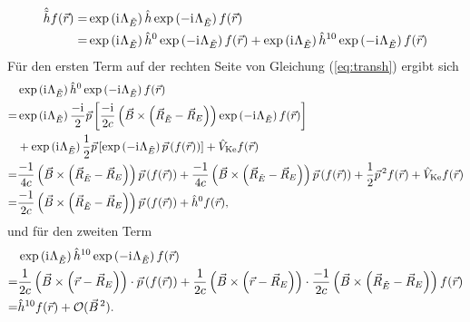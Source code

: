 	\begin{equation}\label{eq:transh}
	\begin{aligned}
	\hat{\tilde{h}}f(\vec{r})=&\exp\left(\mathrm{i}\mkern1mu\Lambda_{\tilde{E}}\right)\hat{h}\exp\left(-\mathrm{i}\mkern1mu\Lambda_{\tilde{E}}\right)f(\vec{r})\\
	=&\exp\left(\mathrm{i}\mkern1mu\Lambda_{\tilde{E}}\right)\hat{h}^0\exp\left(-\mathrm{i}\mkern1mu\Lambda_{\tilde{E}}\right)f(\vec{r})+\exp\left(\mathrm{i}\mkern1mu\Lambda_{\tilde{E}}\right)\hat{h}^{10}\exp\left(-\mathrm{i}\mkern1mu\Lambda_{\tilde{E}}\right)f(\vec{r})
	\end{aligned}
	\end{equation}
	Für den ersten Term auf der rechten Seite von Gleichung (\ref{eq:transh}) ergibt sich
	\begin{equation}\label{eq:transh1}
	\begin{aligned}
	&\exp\left(\mathrm{i}\mkern1mu\Lambda_{\tilde{E}}\right)\hat{h}^0\exp\left(-\mathrm{i}\mkern1mu\Lambda_{\tilde{E}}\right)f(\vec{r})\\
	=&\exp\left(\mathrm{i}\mkern1mu\Lambda_{\tilde{E}}\right)\frac{-\mathrm{i}\mkern1mu}{2}\vec{p}\left[\frac{-\mathrm{i}\mkern1mu}{2c}\left(\vec{B}\times\left(\vec{R}_{\tilde{E}}-\vec{R}_E\right)\right)\exp\left(-\mathrm{i}\mkern1mu\Lambda_{\tilde{E}}\right)f(\vec{r})\right]\\
	&+\exp\left(\mathrm{i}\mkern1mu\Lambda_{\tilde{E}}\right)\frac{1}{2}\vec{p}\left[\exp\left(-\mathrm{i}\mkern1mu\Lambda_{\tilde{E}}\right)\vec{p}\left(f(\vec{r})\right)\right]+\hat{V}_{\textrm{Ke}}f(\vec{r})\\
	=&\frac{-1}{4c}\left(\vec{B}\times\left(\vec{R}_{\tilde{E}}-\vec{R}_E\right)\right)\vec{p}\left(f(\vec{r})\right)
	+\frac{-1}{4c}\left(\vec{B}\times\left(\vec{R}_{\tilde{E}}-\vec{R}_E\right)\right)\vec{p}\left(f(\vec{r})\right)
	+\frac{1}{2}\vec{p}^{\,2}f(\vec{r})+\hat{V}_{\textrm{Ke}}f(\vec{r})\\
	=&\frac{-1}{2c}\left(\vec{B}\times\left(\vec{R}_{\tilde{E}}-\vec{R}_E\right)\right)\vec{p}\left(f(\vec{r})\right)+\hat{h}^0f(\vec{r}),
	\end{aligned}
	\end{equation}
	und für den zweiten Term
	\begin{equation}\label{eq:transh2}
	\begin{aligned}
	&\exp\left(\mathrm{i}\mkern1mu\Lambda_{\tilde{E}}\right)\hat{h}^{10}\exp\left(-\mathrm{i}\mkern1mu\Lambda_{\tilde{E}}\right)f(\vec{r})\\
	=&\frac{1}{2c}\left(\vec{B}\times\left(\vec{r}-\vec{R}_E\right)\right)\cdot\vec{p}\left(f(\vec{r})\right)+\frac{1}{2c}\left(\vec{B}\times\left(\vec{r}-\vec{R}_E\right)\right)\cdot\frac{-1}{2c}\left(\vec{B}\times\left(\vec{R}_{\tilde{E}}-\vec{R}_E\right)\right)f(\vec{r})\\
	=&\hat{h}^{10}f(\vec{r})+\mathcal{O}(\vec{B}^{\,2}).
	\end{aligned}
	\end{equation}
